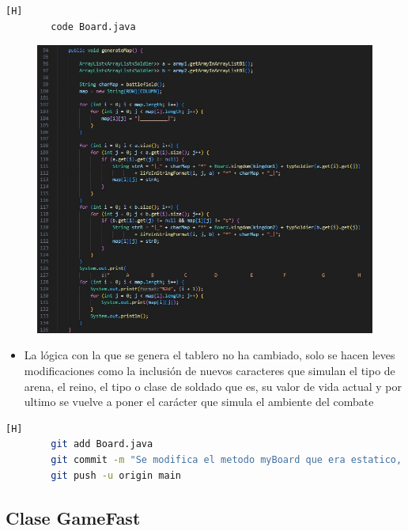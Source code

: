 \documentclass{article}
\begin{document}
	
	\begin{lstlisting}[language=bash,caption={Se modifica la impresión del tablero}][H]
		code Board.java
	\end{lstlisting}
	\begin{figure}[H]
		\centering
		\includegraphics[width=1\textwidth,keepaspectratio]{img/printBoard.jpg}
	\end{figure}
	\begin{itemize}	
		\item La lógica con la que se genera el tablero no ha cambiado, solo se hacen leves modificaciones como la inclusión de nuevos caracteres que simulan el tipo de arena, el reino, el tipo o clase de soldado que es, su valor de vida actual y por ultimo se vuelve a poner el carácter que simula el ambiente del combate 
	\end{itemize}	
	\begin{lstlisting}[language=bash,caption={Commit: ea7d152254cd6643d1efa6457507b9b3f09e5c5f }][H]
		git add Board.java
		git commit -m "Se modifica el metodo myBoard que era estatico, ahora es un metodo de clase y tambien se le cambio el nombre al metodo"			
		git push -u origin main
	\end{lstlisting}

	
	
	\subsection{Clase GameFast}
		
\end{document}
